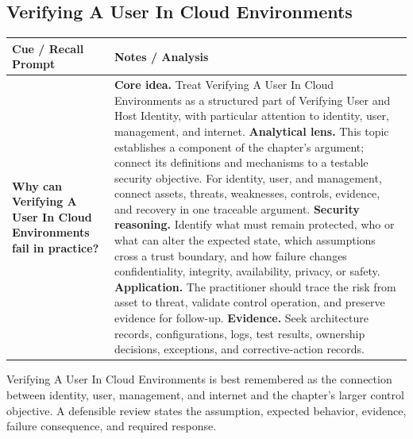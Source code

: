 \documentclass[11pt]{article}
\newcommand{\CornellHeader}{%
\rowcolor{Navy}\color{white}\bfseries Cue / Recall Prompt & \color{white}\bfseries Notes / Analysis\\\hline}
\newcommand{\CornellRow}[2]{%
\cellcolor{CueGray}\RaggedRight\textbf{#1} & \RaggedRight #2\\\hline}
\begin{document}
\subsection*{Verifying A User In Cloud Environments}
\begin{longtable}{>{\RaggedRight\arraybackslash}p{}|>{\RaggedRight\arraybackslash}p{}}
\CornellHeader
\CornellRow{Why can Verifying A User In Cloud Environments fail in practice?}{\textbf{Core idea.} Treat Verifying A User In Cloud Environments as a structured part of Verifying User and Host Identity, with particular attention to identity, user, management, and internet. \textbf{Analytical lens.} This topic establishes a component of the chapter's argument; connect its definitions and mechanisms to a testable security objective. For identity, user, and management, connect assets, threats, weaknesses, controls, evidence, and recovery in one traceable argument. \textbf{Security reasoning.} Identify what must remain protected, who or what can alter the expected state, which assumptions cross a trust boundary, and how failure changes confidentiality, integrity, availability, privacy, or safety. \textbf{Application.} The practitioner should trace the risk from asset to threat, validate control operation, and preserve evidence for follow-up. \textbf{Evidence.} Seek architecture records, configurations, logs, test results, ownership decisions, exceptions, and corrective-action records.}
\end{longtable}
\begin{topicsummary}
Verifying A User In Cloud Environments is best remembered as the connection between identity, user, management, and internet and the chapter's larger control objective. A defensible review states the assumption, expected behavior, evidence, failure consequence, and required response.
\end{topicsummary}
\end{document}

